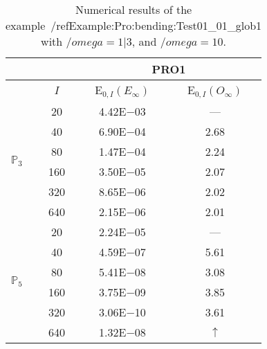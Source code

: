 \begin{table}[H]
\caption{Numerical results of the example~/ref{Example:Pro:bending:Test01_01_glob1} with $/omega=1|3$, and $/omega=10$.}
\setlength{\tabcolsep}{5pt}
\centering
\begin{tabular}{@{}l c c c@{}}
\toprule
 &  & \multicolumn{2}{c}{PRO1}\\
\midrule
 & $I$ & E$_{0,I}(E_{\infty})$ & E$_{0,I}(O_{\infty})$\\
\midrule
\multirow{6}{*}{$\mathbb{P}_{3}$}
 & 20 & 4.42E$-$03 & ---\\
 & 40 & 6.90E$-$04 & 2.68\\
 & 80 & 1.47E$-$04 & 2.24\\
 & 160 & 3.50E$-$05 & 2.07\\
 & 320 & 8.65E$-$06 & 2.02\\
 & 640 & 2.15E$-$06 & 2.01\\
\midrule
\multirow{6}{*}{$\mathbb{P}_{5}$}
 & 20 & 2.24E$-$05 & ---\\
 & 40 & 4.59E$-$07 & 5.61\\
 & 80 & 5.41E$-$08 & 3.08\\
 & 160 & 3.75E$-$09 & 3.85\\
 & 320 & 3.06E$-$10 & 3.61\\
 & 640 & 1.32E$-$08 & $\uparrow$\\
\bottomrule
\end{tabular}
\label{Table:PRO:test_01_01_test30_pro1}
\end{table}
